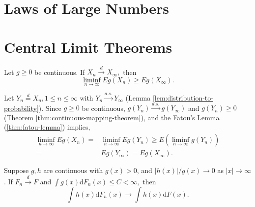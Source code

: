 \section{Laws of Large Numbers}

\section{Central Limit Theorems}

\begin{exercise}
    Let $g\geq 0$ be continuous. If $X_{n}\stackrel{d}{\rightarrow}X_{\infty},$ then
    \begin{equation*}
        \liminf_{n\rightarrow\infty}Eg\left(X_{n}\right)\geq Eg\left(X_{\infty}\right).
    \end{equation*}
    \label{ex:fatou-lemma-distribution}
\end{exercise}

\begin{solution}
    Let $Y_n\stackrel{d}{=}X_n,1\leq n\leq\infty$ with $Y_n\stackrel{a.s.}{\rightarrow}Y_\infty$ (Lemma \ref{lem:distribution-to-probability}).
    Since $g\geq 0$ be continuous, $g(Y_n)\stackrel{a.s.}{\rightarrow}g(Y_\infty)$ and $g(Y_n)\geq 0$ (Theorem \ref{thm:continuous-mapping-theorem}), and the Fatou's Lemma (\ref{thm:fatou-lemma}) implies,
    \begin{equation*}
        \begin{aligned}
            \liminf_{n\rightarrow\infty}Eg(X_n)= & \liminf_{n\rightarrow\infty}Eg(Y_n)\geq E\left(\liminf_{n\rightarrow\infty}g(Y_n)\right) \\
            =                                    & Eg(Y_\infty)=Eg(X_\infty).
        \end{aligned}
    \end{equation*}
\end{solution}

\begin{exercise}
    Suppose $g,h$ are continuous with $g(x)>0$, and $|h(x)|/g(x)\rightarrow 0$ as $|x|\rightarrow\infty$. If $F_{n}\stackrel{d}{\rightarrow}F$ and $\int g(x)\mathrm{d}F_{n}(x)\leq C<\infty,$ then
    \begin{equation*}
        \int h(x)\mathrm{d}F_{n}(x) \rightarrow \int h(x)\mathrm{d}F(x).
    \end{equation*}
\end{exercise}

